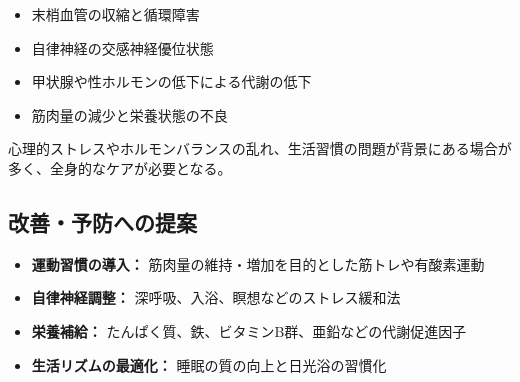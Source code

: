 \documentclass[a4paper,12pt]{article}
\begin{document}
\begin{itemize}
  \item 末梢血管の収縮と循環障害
  \item 自律神経の交感神経優位状態
  \item 甲状腺や性ホルモンの低下による代謝の低下
  \item 筋肉量の減少と栄養状態の不良
\end{itemize}

心理的ストレスやホルモンバランスの乱れ、生活習慣の問題が背景にある場合が多く、全身的なケアが必要となる。

\subsection*{改善・予防への提案}

\begin{itemize}
  \item \textbf{運動習慣の導入：} 筋肉量の維持・増加を目的とした筋トレや有酸素運動
  \item \textbf{自律神経調整：} 深呼吸、入浴、瞑想などのストレス緩和法
  \item \textbf{栄養補給：} たんぱく質、鉄、ビタミンB群、亜鉛などの代謝促進因子
  \item \textbf{生活リズムの最適化：} 睡眠の質の向上と日光浴の習慣化
\end{itemize}
\end{document}
